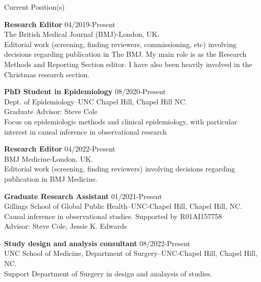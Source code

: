 \documentclass{resume} %
\begin{document}
\begin{rSection}{Current Position(s)}

{\bf Research Editor } \hfill {04/2019-Present}
\\ 
The British Medical Journal (BMJ)-London, UK. 
\\
Editorial work (screening, finding reviewers, commissioning, etc) involving decisions regarding publication in The BMJ. My main role is as the Research Methods and Reporting Section editor. I have also been heavily involved in the Christmas research section.

{\bf PhD Student in Epidemiology} \hfill {08/2020-Present}
\\ 
Dept. of Epidemiology--UNC Chapel Hill, Chapel Hill NC. 
\\
Graduate Advisor: Steve Cole\\
Focus on epidemiologic methods and clinical epidemiology, with particular interest in causal inference in observational research

{\bf Research Editor } \hfill {04/2022-Present}
\\ 
BMJ Medicine-London, UK. 
\\
Editorial work (screening, finding reviewers) involving decisions regarding publication in  BMJ Medicine.

{\bf Graduate Research Assistant} \hfill {01/2021-Present}
\\ 
Gillings School of Global Public Health--UNC-Chapel Hill, Chapel Hill, NC. 
\\
Causal inference in observational studies. Supported by R01AI157758\\
Advisor: Steve Cole, Jessie K. Edwards


{\bf Study design and analysis consultant} \hfill {08/2022-Present}
\\ 
UNC School of Medicine, Department of Surgery--UNC-Chapel Hill, Chapel Hill, NC. 
\\
Support Department of Surgery in design and analaysis of studies.




\end{rSection}

   
\end{document}
